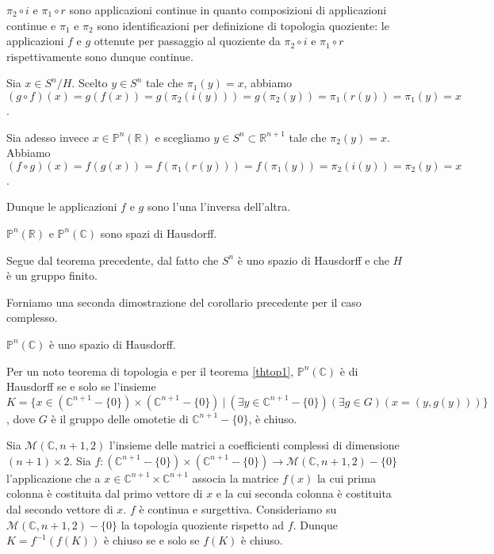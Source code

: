 \par $\pi_2 \circ i$ e $\pi_1 \circ r$ sono applicazioni continue in quanto composizioni di applicazioni continue e $\pi_1$ e $\pi_2$ sono identificazioni per definizione di topologia quoziente: le applicazioni $f$ e $g$ ottenute per passaggio al quoziente da $\pi_2 \circ i$ e $\pi_1 \circ r$ rispettivamente sono dunque continue.
\par Sia $x \in S^n/H$. Scelto $y \in S^n$ tale che $\pi_1(y) = x$, abbiamo $(g \circ f)(x) = g(f(x)) = g(\pi_2(i(y))) = g(\pi_2(y)) = \pi_1(r(y)) = \pi_1(y) = x$.
\par Sia adesso invece $x \in \mathbb{P}^n(\mathbb{R})$ e scegliamo $y \in S^n \subset \mathbb{R}^{n + 1}$ tale che $\pi_2(y) = x$. Abbiamo $(f \circ g)(x) = f(g(x)) = f(\pi_1(r(y))) = f(\pi_1(y)) = \pi_2(i(y)) = \pi_2(y) = x$.
\par Dunque le applicazioni $f$ e $g$ sono l'una l'inversa dell'altra. \EndProof
\begin{Corollary}\label{cortop1}
	$\mathbb{P}^n(\mathbb{R})$ e $\mathbb{P}^n(\mathbb{C})$ sono spazi di Hausdorff.
\end{Corollary}
\Proof Segue dal teorema precedente, dal fatto che $S^n$ \`e uno spazio di Hausdorff e che $H$ \`e un gruppo finito. \EndProof
\par Forniamo una seconda dimostrazione del corollario precedente per il caso complesso.
\begin{Theorem}\label{thtop4}
	$\mathbb{P}^n(\mathbb{C})$ \`e uno spazio di Hausdorff.
\end{Theorem}
\Proof Per un noto teorema di topologia e per il teorema \ref{thtop1}, $\mathbb{P}^n(\mathbb{C})$ \`e di Hausdorff se e solo se l'insieme $K = \lbrace x \in (\mathbb{C}^{n + 1} - \lbrace 0 \rbrace) \times (\mathbb{C}^{n + 1} - \lbrace 0 \rbrace)\ |\ (\exists y \in \mathbb{C}^{n + 1} - \lbrace 0 \rbrace)(\exists g \in G)(x = (y, g(y))) \rbrace$, dove $G$ \`e il gruppo delle omotetie di $\mathbb{C}^{n + 1} - \lbrace 0 \rbrace$, \`e chiuso.
	\par Sia $\mathcal{M}(\mathbb{C}, n + 1, 2)$ l'insieme delle matrici a coefficienti complessi di dimensione $(n + 1) \times 2$. Sia $f: (\mathbb{C}^{n+ 1} - \lbrace 0 \rbrace) \times (\mathbb{C}^{n + 1} - \lbrace 0 \rbrace) \rightarrow \mathcal{M}(\mathbb{C}, n + 1, 2) - \lbrace 0 \rbrace$ l'applicazione che a $x \in \mathbb{C}^{n + 1} \times \mathbb{C}^{n + 1}$ associa la matrice $f(x)$ la cui prima colonna \`e costituita dal primo vettore di $x$ e la cui seconda colonna \`e costituita dal secondo vettore di $x$. $f$ \`e continua e surgettiva. Consideriamo su $\mathcal{M}(\mathbb{C}, n + 1, 2) - \lbrace 0 \rbrace$ la topologia quoziente rispetto ad $f$. Dunque $K = f^{-1}(f(K))$ \`e chiuso se e solo se $f(K)$ \`e chiuso.
